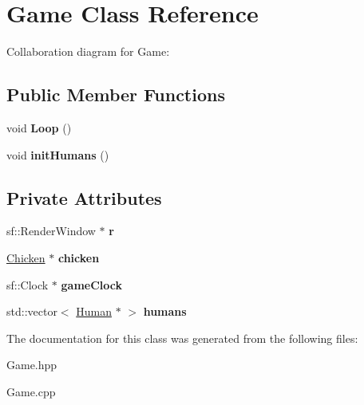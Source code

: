 \hypertarget{classGame}{}\section{Game Class Reference}
\label{classGame}


Collaboration diagram for Game\+:
\subsection*{Public Member Functions}
\begin{DoxyCompactItemize}
\item 
\mbox{\label{classGame_a28d8a0a65bda89be42d9c46fc2e4f14b}} 
void {\bfseries Loop} ()
\item 
\mbox{\label{classGame_a1d9f9e87693fdd827c42600ee0e44224}} 
void {\bfseries init\+Humans} ()
\end{DoxyCompactItemize}
\subsection*{Private Attributes}
\begin{DoxyCompactItemize}
\item 
\mbox{\label{classGame_acc73312d171386cbafa6bc0c049fd99f}} 
sf\+::\+Render\+Window $\ast$ {\bfseries r}
\item 
\mbox{\label{classGame_af7433211cb05462d1733958d7f812aae}} 
\hyperlink{classChicken}{Chicken} $\ast$ {\bfseries chicken}
\item 
\mbox{\label{classGame_a91d5b7794fc0514eca40e60976fe35f6}} 
sf\+::\+Clock $\ast$ {\bfseries game\+Clock}
\item 
\mbox{\label{classGame_aa4bdc78ea8fa2a5d24f50d7eb95bfe2a}} 
std\+::vector$<$ \hyperlink{classHuman}{Human} $\ast$ $>$ {\bfseries humans}
\end{DoxyCompactItemize}


The documentation for this class was generated from the following files\+:\begin{DoxyCompactItemize}
\item 
Game.\+hpp\item 
Game.\+cpp\end{DoxyCompactItemize}
